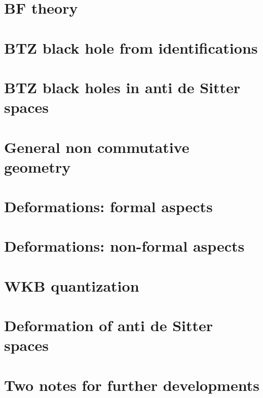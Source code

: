 \chapter{BF theory}


\chapter{BTZ black hole from identifications}




\chapter{BTZ black holes in anti de Sitter spaces}                  \label{ChapBHinAdS}
%
%










\chapter{General non commutative geometry}




\chapter{Deformations: formal aspects}          \label{ChapDefo}


\chapter{Deformations: non-formal aspects}


      

\chapter{WKB quantization}


\chapter{Deformation of anti de Sitter spaces}   \label{ChDefoBH}


\chapter{Two notes for further developments}        \label{ChapNoteDev}



